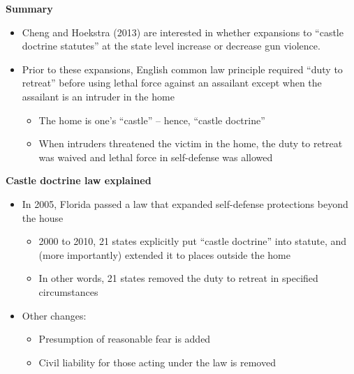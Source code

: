 \documentclass[notes=show]{beamer}
\begin{document}
\begin{frame}[plain]
	\begin{center}
	\textbf{Summary}
	\end{center}
	
	\begin{itemize}
	\item Cheng and Hoekstra (2013) are interested in whether expansions to ``castle doctrine statutes'' at the state level increase or decrease gun violence.  
	\item Prior to these expansions, English common law principle required ``duty to retreat'' before using lethal force against an assailant except when the assailant is an intruder in the home
		\begin{itemize}
		\item The home is one's ``castle'' -- hence, ``castle doctrine''
		\item When intruders threatened the victim in the home, the duty to retreat was waived and lethal force in self-defense was allowed
		\end{itemize}
	\end{itemize}
\end{frame}

\begin{frame}[plain]
	\begin{center}
	\textbf{Castle doctrine law explained}
	\end{center}
	
	\begin{itemize}
	\item In 2005, Florida passed a law that expanded self-defense protections beyond the house
		\begin{itemize}
		\item 2000 to 2010, 21 states explicitly put ``castle doctrine'' into statute, and (more importantly) extended it to places outside the home
		\item In other words, 21 states removed the duty to retreat in specified circumstances
		\end{itemize}
	\item Other changes:
		\begin{itemize}
		\item Presumption of reasonable fear is added
		\item Civil liability for those acting under the law is removed
		\end{itemize}
	\end{itemize}
\end{frame}
\end{document}
